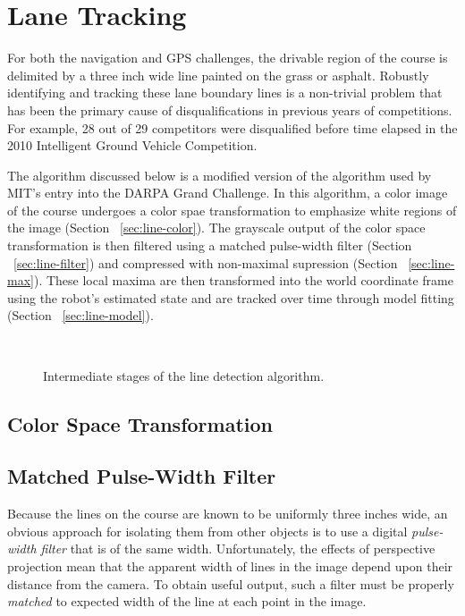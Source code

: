 \documentclass[11pt,twocolumn]{article}
\begin{document}
\section{Lane Tracking}
\label{sec:lane}
For both the navigation and GPS challenges, the drivable region of the course
is delimited by a three inch wide line painted on the grass or asphalt.
Robustly identifying and tracking these lane boundary lines is a non-trivial
problem that has been the primary cause of disqualifications in previous years
of competitions. For example, 28 out of 29 competitors were disqualified before
time elapsed in the 2010 Intelligent Ground Vehicle Competition.

The algorithm discussed below is a modified version of the algorithm used by
MIT's entry into the DARPA Grand Challenge. In this algorithm, a color image
of the course undergoes a color spae transformation to emphasize white regions
of the image (Section ~\ref{sec:line-color}). The grayscale output of the color
space transformation is then filtered using a matched pulse-width filter
(Section ~\ref{sec:line-filter}) and compressed with non-maximal supression
(Section ~\ref{sec:line-max}). These local maxima are then transformed into
the world coordinate frame using the robot's estimated state and are tracked
over time through model fitting (Section ~\ref{sec:line-model}).

\begin{figure*}
	\\
	\caption{Intermediate stages of the line detection algorithm.}
	\label{fig:lane-all}
\end{figure*}

\subsection{Color Space Transformation}


\subsection{Matched Pulse-Width Filter}
Because the lines on the course are known to be uniformly three inches wide, an
obvious approach for isolating them from other objects is to use a digital
\textit{pulse-width filter} that is of the same width. Unfortunately, the
effects of perspective projection mean that the apparent width of lines in the
image depend upon their distance from the camera. To obtain useful output, such
a filter must be properly \textit{matched} to expected width of the line at
each point in the image.
\end{document}
